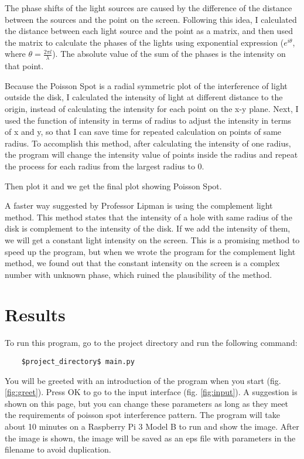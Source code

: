 \documentclass[12pt]{article}
\begin{document}
The phase shifts of the light sources are caused by the difference of the distance between the sources and the point on the screen. Following this idea, I calculated the distance between each light source and the point as a matrix, and then used the matrix to calculate the phases of the lights using exponential expression ($e^{i\theta}$, where $\theta = \frac{2 \pi l}{\lambda}$). The absolute value of the sum of the phases is the intensity on that point. 

Because the Poisson Spot is a radial symmetric plot of the interference of light outside the disk, I calculated the intensity of light at different distance to the origin, instead of calculating the intensity for each point on the x-y plane. Next, I used the function of intensity in terms of radius to adjust the intensity in terms of x and y, so that I can save time for repeated calculation on points of same radius. To accomplish this method, after calculating the intensity of one radius, the program will change the intensity value of points inside the radius and repeat the process for each radius from the largest radius to 0. 

Then plot it and we get the final plot showing Poisson Spot.

A faster way suggested by Professor Lipman is using the complement light method. This method states that the intensity of a hole with same radius of the disk is complement to the intensity of the disk. If we add the intensity of them, we will get a constant light intensity on the screen. This is a promising method to speed up the program, but when we wrote the program for the complement light method, we found out that the constant intensity on the screen is a complex number with unknown phase, which ruined the plausibility of the method. 

\section{Results}

To run this program, go to the project directory and run
the following command:
{\selectfont 
\begin{lstlisting}
    $project_directory$ main.py
\end{lstlisting}
}

You will be greeted with an introduction of the program 
when you start (fig. \ref{fig:greet}). Press 
OK to go to the input interface (fig. \ref{fig:input}).
A suggestion is shown on this page, but you can change 
these parameters as long as they meet the requirements
of poisson spot interference pattern. The program will
take about 10 minutes on a Raspberry Pi 3 Model B to run
and show the image. After the image is shown, 
the image will be saved as an eps
file with parameters in the filename to avoid duplication.
\end{document}
